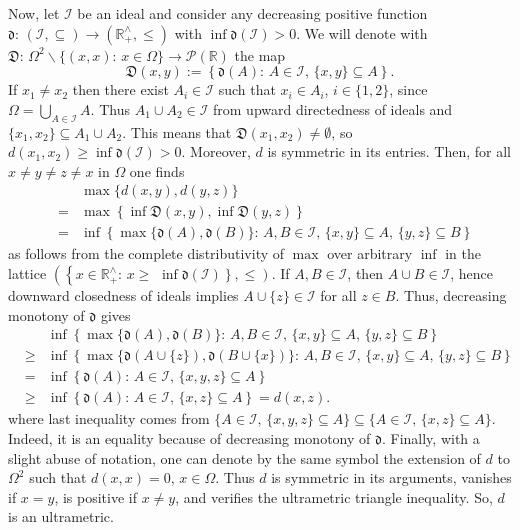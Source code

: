 \documentclass[11pt,british,reqno]{article}
\numberwithin{equation}{section}
\numberwithin{figure}{section}
\numberwithin{table}{section}
\theoremstyle{definition}
\theoremstyle{definition}
\theoremstyle{plain}
\theoremstyle{plain}
\theoremstyle{remark}
\theoremstyle{plain}
\numberwithin{equation}{section}
\numberwithin{figure}{section}
\numberwithin{table}{section}
\theoremstyle{plain}
\begin{document}
Now, let $\mathcal{I}$ be an ideal and consider any decreasing positive
function $\mathfrak{d}:\,(\mathcal{I},\subseteq)\longrightarrow(\mathbb{R}_{+}^{\wedge},\leq)$
with $\inf\mathfrak{d}(\mathcal{I})>0$. We will denote with $\mathfrak{D}:\,\Omega^{2}\backslash\{(x,x):\,x\in\Omega\}\longrightarrow\mathcal{P}(\mathbb{R})$
the map 
\begin{equation}
{\displaystyle \mathfrak{D}(x,y):=\left\{ \mathfrak{d}(A):\,A\in\mathcal{I},\,\{x,y\}\subseteq A\right\} .}\label{eq: set of (x,y)-coverings}
\end{equation}
If $x_{1}\neq x_{2}$ then there exist $A_{i}\in\mathcal{I}$ such
that $x_{i}\in A_{i}$, $i\in\{1,2\}$, since ${\displaystyle \Omega=\bigcup_{A\in\mathcal{I}}A}$.
Thus $A_{1}\cup A_{2}\in\mathcal{I}$ from upward directedness of
ideals and $\{x_{1},x_{2}\}\subseteq A_{1}\cup A_{2}$. This means
that $\mathfrak{D}(x_{1},x_{2})\neq\emptyset$, so $d(x_{1},x_{2})\geq\inf\mathfrak{d}(\mathcal{I})>0$.
Moreover, $d$ is symmetric in its entries. Then, for all $x\neq y\neq z\neq x$
in $\Omega$ one finds 
\begin{eqnarray}
 & & \max\{d(x,y),d(y,z)\}\nonumber \\
 & = & \max\left\{ \inf\mathfrak{D}(x,y),\inf\mathfrak{D}(y,z)\right\} \nonumber \\
 & = & \inf\left\{ \max\{\mathfrak{d}(A),\mathfrak{d}(B)\}:\,A,B\in\mathcal{I},\,\{x,y\}\subseteq A,\,\{y,z\}\subseteq B\right\} \label{eq: derivation ultrametric triangle inequality, 1} 
\end{eqnarray}
as follows from the complete distributivity of $\max$ over arbitrary
$\inf$ in the lattice  $\left(\left\{ x\in\mathbb{R}_{+}^{\wedge}:\,x\geq\right.\right.$ $\left.\left.\inf\mathfrak{d}(\mathcal{I})\right\} ,\leq\right)$.
If $A,B\in\mathcal{I}$, then $A\cup B\in\mathcal{I}$, hence downward
closedness of ideals implies $A\cup\{z\}\in\mathcal{I}$ for all $z\in B$.
Thus, decreasing monotony of $\mathfrak{d}$ gives 
\begin{eqnarray}
 & &\inf\left\{ \max\{\mathfrak{d}(A),\mathfrak{d}(B)\}:\,A,B\in\mathcal{I},\,\{x,y\}\subseteq A,\,\{y,z\}\subseteq B\right\} \nonumber \\
& \geq & \inf\left\{ \max\{\mathfrak{d}(A\cup\{z\}),\mathfrak{d}(B\cup\{x\})\}:\,A,B\in\mathcal{I},\,\{x,y\}\subseteq A,\,\{y,z\}\subseteq B\right\} \nonumber \\
& = & \inf\left\{ \mathfrak{d}(A):\,A\in\mathcal{I},\,\{x,y,z\}\subseteq A\right\} \nonumber \\
& \geq & \inf\left\{ \mathfrak{d}(A):\,A\in\mathcal{I},\,\{x,z\}\subseteq A\right\} =d(x,z).\label{eq: derivation ultrametric triangle inequality, 2} 
\end{eqnarray}
where last inequality comes from $\{A\in\mathcal{I},\,\{x,y,z\}\subseteq A\}\subseteq\{A\in\mathcal{I},\,\{x,z\}\subseteq A\}.$
Indeed, it is an equality because of decreasing monotony of $\mathfrak{d}$.
Finally, with a slight abuse of notation, one can denote by the same
symbol the extension of $d$ to $\Omega^{2}$ such that $d(x,x)=0$,
$x\in\Omega$. Thus $d$ is symmetric in its arguments, vanishes if
$x=y$, is positive if $x\neq y$, and verifies the ultrametric triangle
inequality. So, $d$ is an ultrametric.
\end{document}
